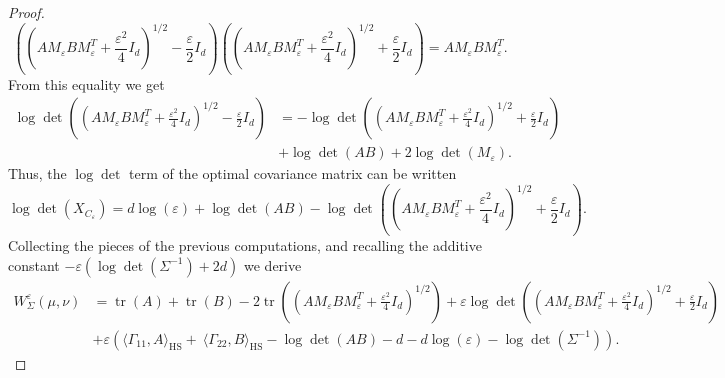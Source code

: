 \documentclass[]{article}
\DeclareMathOperator{\tr}{tr}
\DeclareMathOperator{\HS}{HS}
\numberwithin{equation}{section}
\theoremstyle{plain}
\begin{document}
\begin{proof}
\begin{equation}
    \left( \left(AM_{\varepsilon}B M_{\varepsilon}^T+ \frac{\varepsilon^2}{4}I_d \right)^{1/2}- \frac{\varepsilon}{2}I_d\right) \left( \left(AM_{\varepsilon}B M_{\varepsilon}^T+ \frac{\varepsilon^2}{4}I_d \right)^{1/2} + \frac{\varepsilon}{2}I_d\right) = AM_{\varepsilon}B M_{\varepsilon}^T.
\end{equation}
From this equality we get 
\begin{align*}
     \log\det\left( \left(AM_{\varepsilon}B M_{\varepsilon}^T+ \frac{\varepsilon^2}{4}I_d \right)^{1/2}- \frac{\varepsilon}{2}I_d\right)& = -  \log\det\left( \left(AM_{\varepsilon}B M_{\varepsilon}^T+ \frac{\varepsilon^2}{4}I_d \right)^{1/2}+\frac{\varepsilon}{2}I_d\right)\\
     &  + \log \det(AB) + 2\log \det(M_{\varepsilon}).
\end{align*}
Thus, the $\log \det$ term of the optimal covariance matrix can be written
\begin{equation*}
    \log \det(X_{C_\varepsilon}) = d \log(\varepsilon) + \log \det(AB) -  \log\det\left( \left(AM_{\varepsilon}B M_{\varepsilon}^T+ \frac{\varepsilon^2}{4}I_d \right)^{1/2}+\frac{\varepsilon}{2}I_d\right).
\end{equation*}
Collecting the pieces of the previous computations, and recalling the additive constant $-\varepsilon(\log \det(\Sigma^{-1}) + 2d)$ we derive 
\begin{align*}
    W_\Sigma^{\varepsilon}(\mu, \nu) & = \tr(A) + \tr(B)  - 2\tr\left(  \left( AM_{\varepsilon}BM_{\varepsilon}^T+\frac{\varepsilon^2}{4}I_d\right)^{1/2}  \right) + \varepsilon \log  \det\left( \left(AM_{\varepsilon}B M_{\varepsilon}^T+ \frac{\varepsilon^2}{4}I_d \right)^{1/2}+ \frac{\varepsilon}{2}I_d\right)  \\
    & + \varepsilon  \left(\langle \Gamma_{11}, A \rangle_{\HS} + \ \langle \Gamma_{22}, B \rangle_{\HS} - \log\det(AB) - d-d\log(\varepsilon)  - \log \det(\Sigma^{-1}) \right).
\end{align*}


\end{proof}
\end{document}
